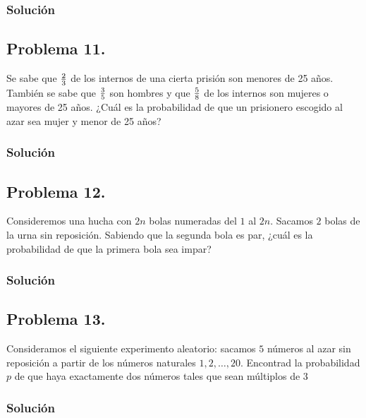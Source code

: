 \documentclass[
]{article}
\begin{document}
\hypertarget{soluciuxf3n-9}{%
\subsubsection{Solución}\label{soluciuxf3n-9}}

\hypertarget{problema-11.}{%
\subsection{Problema 11.}\label{problema-11.}}

Se sabe que \({2 \over 3}\) de los internos de una cierta prisión son
menores de 25 años. También se sabe que \({3\over 5}\) son hombres y que
\({5\over 8}\) de los internos son mujeres o mayores de 25 años. ¿Cuál
es la probabilidad de que un prisionero escogido al azar sea mujer y
menor de 25 años?

\hypertarget{soluciuxf3n-10}{%
\subsubsection{Solución}\label{soluciuxf3n-10}}

\hypertarget{problema-12.}{%
\subsection{Problema 12.}\label{problema-12.}}

Consideremos una hucha con \(2n\) bolas numeradas del \(1\) al \(2n\).
Sacamos \(2\) bolas de la urna sin reposición. Sabiendo que la segunda
bola es par, ¿cuál es la probabilidad de que la primera bola sea impar?

\hypertarget{soluciuxf3n-11}{%
\subsubsection{Solución}\label{soluciuxf3n-11}}

\hypertarget{problema-13.}{%
\subsection{Problema 13.}\label{problema-13.}}

Consideramos el siguiente experimento aleatorio: sacamos \(5\) números
al azar sin reposición a partir de los números naturales
\(1,2,\dots,20\). Encontrad la probabilidad \(p\) de que haya
exactamente dos números tales que sean múltiplos de \(3\)

\hypertarget{soluciuxf3n-12}{%
\subsubsection{Solución}\label{soluciuxf3n-12}}
\end{document}
